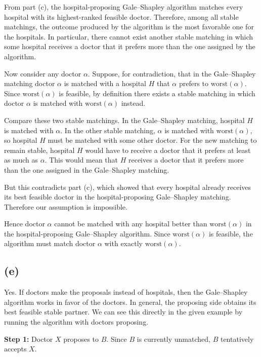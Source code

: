 \documentclass{brockcosc3p03}
\begin{document}
From part (c), the hospital-proposing Gale--Shapley algorithm matches every hospital with its highest-ranked feasible doctor. Therefore, among all stable matchings, the outcome produced by the algorithm is the most favorable one for the hospitals. In particular, there cannot exist another stable matching in which some hospital receives a doctor that it prefers more than the one assigned by the algorithm.

Now consider any doctor $\alpha$. Suppose, for contradiction, that in the Gale--Shapley matching doctor $\alpha$ is matched with a hospital $H$ that $\alpha$ prefers to $\mathrm{worst}(\alpha)$. Since $\mathrm{worst}(\alpha)$ is feasible, by definition there exists a stable matching in which doctor $\alpha$ is matched with $\mathrm{worst}(\alpha)$ instead.

Compare these two stable matchings. In the Gale--Shapley matching, hospital $H$ is matched with $\alpha$. In the other stable matching, $\alpha$ is matched with $\mathrm{worst}(\alpha)$, so hospital $H$ must be matched with some other doctor. For the new matching to remain stable, hospital $H$ would have to receive a doctor that it prefers at least as much as $\alpha$. This would mean that $H$ receives a doctor that it prefers more than the one assigned in the Gale--Shapley matching.

But this contradicts part (c), which showed that every hospital already receives its best feasible doctor in the hospital-proposing Gale--Shapley matching. Therefore our assumption is impossible.

Hence doctor $\alpha$ cannot be matched with any hospital better than $\mathrm{worst}(\alpha)$ in the hospital-proposing Gale--Shapley algorithm. Since $\mathrm{worst}(\alpha)$ is feasible, the algorithm must match doctor $\alpha$ with exactly $\mathrm{worst}(\alpha)$.

\subsection*{(e)}

Yes. If doctors make the proposals instead of hospitals, then the Gale--Shapley algorithm works in favor of the doctors. In general, the proposing side obtains its best feasible stable partner. We can see this directly in the given example by running the algorithm with doctors proposing.

\textbf{Step 1:} Doctor $X$ proposes to $B$. Since $B$ is currently unmatched, $B$ tentatively accepts $X$.
\end{document}
